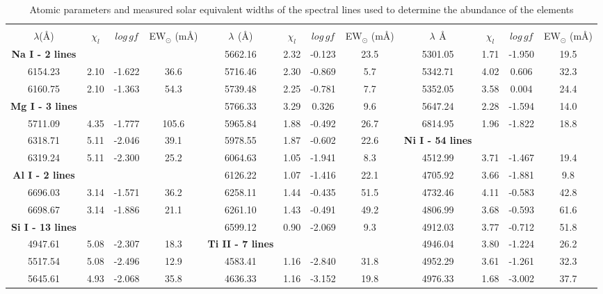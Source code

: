 \documentclass[dvips,12pt,a4paper]{report}
\begin{document}
{{\begin{table}[h]\tiny
\label {loggf}
  \centering
\caption[Atomic parameters of the spectral lines]{Atomic parameters and measured solar equivalent widths of the spectral lines used to determine the abundance of the elements} 
  \begin{tabular}{c c c c | c c c c | c c c c}
\hline
\hline 
\\
$\lambda$(\AA) & $\chi_l$ & $log\,gf$ & EW$_\odot$ (m\AA{}) &$\lambda\,\ $(\AA{}) & $\chi_l$ & $log\,gf$ & EW$_\odot$ (m\AA{}) &$\lambda\,\ $\AA{} & $\chi_l$ & $log\,gf$ & EW$_\odot$ (m\AA{}) \\
\hline
\textbf{Na I - 2 lines} &  & &  & 5662.16 & 2.32 & -0.123 &  23.5 & 5301.05 & 1.71 & -1.950 &  19.5 \\
6154.23 & 2.10 & -1.622 &  36.6 & 5716.46 & 2.30 & -0.869 &   5.7 & 5342.71 & 4.02 &  0.606 &  32.3 \\
6160.75 & 2.10 & -1.363 &  54.3 & 5739.48 & 2.25 & -0.781 &   7.7 & 5352.05 & 3.58 &  0.004 &  24.4 \\
\textbf{Mg I - 3 lines} &  & &  & 5766.33 & 3.29 &  0.326 &   9.6 & 5647.24 & 2.28 & -1.594 &  14.0 \\
5711.09 & 4.35 & -1.777 & 105.6 & 5965.84 & 1.88 & -0.492 &  26.7 & 6814.95 & 1.96 & -1.822 &  18.8 \\
6318.71 & 5.11 & -2.046 &  39.1 & 5978.55 & 1.87 & -0.602 &  22.6 & \textbf{Ni I - 54 lines} & & &  \\
6319.24 & 5.11 & -2.300 &  25.2 & 6064.63 & 1.05 & -1.941 &   8.3 & 4512.99 & 3.71 & -1.467 &  19.4 \\
\textbf{Al I - 2 lines } &  & &  & 6126.22 & 1.07 & -1.416 &  22.1 & 4705.92 & 3.66 & -1.881 &   9.8 \\
6696.03 & 3.14 & -1.571 &  36.2 & 6258.11 & 1.44 & -0.435 &  51.5 & 4732.46 & 4.11 & -0.583 &  42.8 \\
6698.67 & 3.14 & -1.886 &  21.1 & 6261.10 & 1.43 & -0.491 &  49.2 & 4806.99 & 3.68 & -0.593 &  61.6 \\
\textbf{Si I - 13 lines} &  & & & 6599.12 & 0.90 & -2.069 &   9.3 & 4912.03 & 3.77 & -0.712 &  51.8 \\
4947.61 & 5.08 & -2.307 &  18.3 & \textbf{Ti II - 7 lines} & & & &  4946.04 & 3.80 & -1.224 &  26.2 \\
5517.54 & 5.08 & -2.496 &  12.9 & 4583.41 & 1.16 & -2.840 &  31.8 & 4952.29 & 3.61 & -1.261 &  32.3 \\
5645.61 & 4.93 & -2.068 &  35.8 & 4636.33 & 1.16 & -3.152 &  19.8 & 4976.33 & 1.68 & -3.002 &  37.7 \\

\end{tabular}
\end{table}}}
\end{document}
